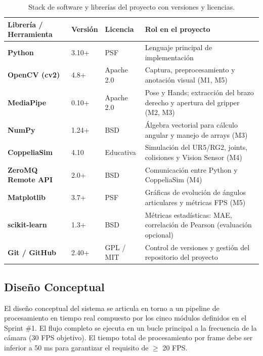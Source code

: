 \begin{table}[h!]
\centering
\label{tab:software}
\renewcommand{\arraystretch}{1.3}
\begin{tabularx}{\textwidth}{
    >{\bfseries}p{3cm}
    p{2cm}
    p{2.2cm}
    X
}
\toprule
\textbf{Librería / Herramienta} &
\textbf{Versión} &
\textbf{Licencia} &
\textbf{Rol en el proyecto} \\
\midrule
Python        & 3.10+  & PSF         & Lenguaje principal de implementación \\
\midrule
OpenCV (cv2)  & 4.8+   & Apache 2.0  & Captura, preprocesamiento y anotación visual (M1, M5) \cite{Bradski2000} \\
\midrule
MediaPipe     & 0.10+  & Apache 2.0  & Pose y Hands; extracción del brazo derecho y apertura del gripper (M2, M3) \cite{Bazarevskyetal2020, Lugaresietal2019} \\
\midrule
NumPy         & 1.24+  & BSD         & Álgebra vectorial para cálculo angular y manejo de arrays (M3) \\
\midrule
CoppeliaSim   & 4.10   & Educativa   & Simulación del UR5/RG2, joints, colisiones y Vision Sensor (M4) \\
\midrule
ZeroMQ Remote API & 2.0+ & BSD & Comunicación entre Python y CoppeliaSim (M4) \\
\midrule
Matplotlib    & 3.7+   & PSF         & Gráficas de evolución de ángulos articulares y métricas FPS (M5) \\
\midrule
scikit-learn  & 1.3+   & BSD         & Métricas estadísticas: MAE, correlación de Pearson (evaluación opcional) \\
\midrule
Git / GitHub  & 2.40+  & GPL / MIT   & Control de versiones y gestión del repositorio del proyecto \\
\bottomrule
\end{tabularx}
\caption{Stack de software y librerías del proyecto con versiones y licencias.}
\end{table}

\subsection{Diseño Conceptual}

El diseño conceptual del sistema se articula en torno a un pipeline de
procesamiento en tiempo real compuesto por los cinco módulos definidos en
el Sprint \#1. El flujo completo se ejecuta en un bucle principal a la
frecuencia de la cámara (30 FPS objetivo). El tiempo total de
procesamiento por frame debe ser inferior a 50 ms para garantizar el
requisito de $\geq$ 20 FPS. \cite{Bazarevskyetal2020, Bradski2000}

